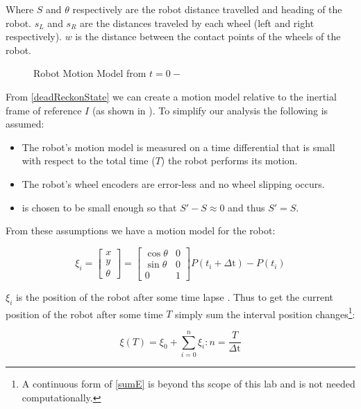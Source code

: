 \documentclass[main.tex]{subfiles}
\begin{document}
Where $S$ and $\theta$ respectively are the robot distance travelled and heading
of the robot. $s_L$ and $s_R$ are the distances traveled by each wheel (left and
right respectively). $w$ is the distance between the contact points of the
wheels of the robot.

\begin{figure}[H]
	\begin{center}
	
	\end{center}
	\caption{Robot Motion Model from $t=0 -$ \delt}
	\label{fig:2wrMotion}
\end{figure}


From \eqref{deadReckonState} we can create a motion model relative to the
inertial frame of reference $I$ (as shown in ). To simplify
our analysis the following is assumed:

\begin{itemize}
\item The robot's motion model is measured on a time differential \delt that
is small with respect to the total time ($T$) the robot performs its motion. 
\item The robot's wheel encoders are error-less and no wheel slipping occurs.
\item \delt is chosen to be small enough so that $S\mathrm{'}-S \approx 0$ and
thus $S\mathrm{'} = S$.
\end{itemize}

From these assumptions we have a motion model for the robot:

\begin{equation}
\label{eq:motionState}
\xi_{i} = 
\begin{bmatrix}
x \\ y \\ \theta
\end{bmatrix}
=
\begin{bmatrix}
\cos{\theta} & 0\\
\sin{\theta} & 0\\
0 & 1
\end{bmatrix}
P(t_i+\Delta\mathrm{t})-P(t_i)
\end{equation}

$\xi_{i}$ is the position of the robot after some time lapse \delt. Thus to get
the current position of the robot after some time $T$ simply sum the interval
position changes\footnote{A continuous form of \eqref{sumE} is beyond ths scope
of this lab and is not needed computationally.}: 

\begin{equation}
\label{eq:sumE}
\xi(T) = \xi_0 + \sum^{n}_{i=0} \xi_{i} : n = \frac{T}{\Delta\mathrm{t}}
\end{equation}
\end{document}
